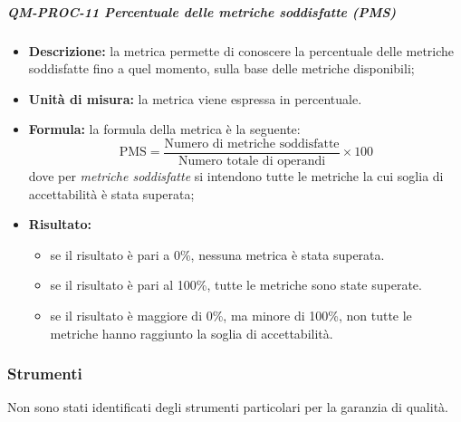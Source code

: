 		\subparagraph{QM-PROC-11 Percentuale delle metriche soddisfatte (PMS)}
            \begin{itemize}
                \item \textbf{Descrizione: }
                    la metrica permette di conoscere la percentuale delle metriche soddisfatte fino a quel momento, sulla base delle metriche disponibili;

                \item \textbf{Unità di misura: }
                la metrica viene espressa in percentuale.

                \item \textbf{Formula: }
                la formula della metrica è la seguente:
                \[
                    \text{PMS} = \frac{\text{Numero di metriche soddisfatte}}{\text{Numero totale di operandi}} \times 100
                \]
                dove per \textit{metriche soddisfatte} si intendono tutte le metriche la cui soglia di accettabilità è stata superata;

                \item \textbf{Risultato: }
                \begin{itemize}
                    \item se il risultato è pari a 0\%, nessuna metrica è stata superata.
                    \item se il risultato è pari al 100\%, tutte le metriche sono state superate.
                    \item se il risultato è maggiore di 0\%, ma minore di 100\%, non tutte le metriche hanno raggiunto la soglia di accettabilità.
                \end{itemize}
            \end{itemize}

	\subsubsection{Strumenti}

	Non sono stati identificati degli strumenti particolari per la garanzia di qualità.






		
